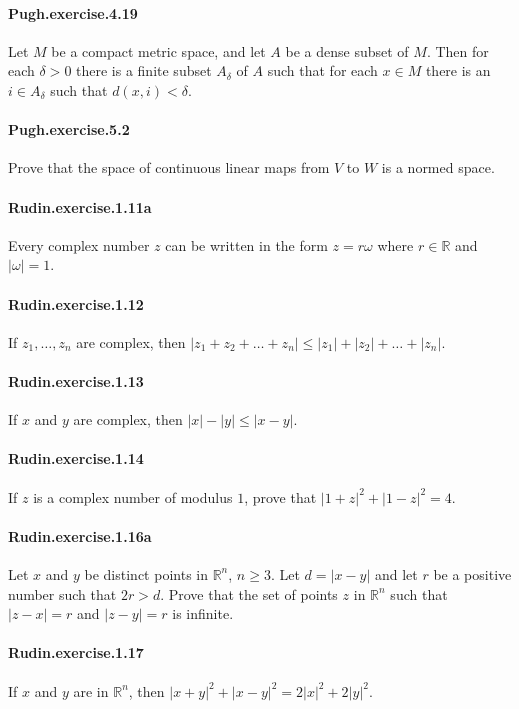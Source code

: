 \documentclass{article}
\begin{document}
\paragraph{Pugh.exercise.4.19} Let $M$ be a compact metric space, and let $A$ be a dense subset of $M$. Then for each $\delta > 0$ there is a finite subset $A_\delta$ of $A$ such that for each $x\in M$ there is an $i\in A_\delta$ such that $d(x, i) < \delta$.

\paragraph{Pugh.exercise.5.2} Prove that the space of continuous linear maps from $V$ to $W$ is a normed space.

\paragraph{Rudin.exercise.1.11a} Every complex number $z$ can be written in the form $z=r\omega$ where $r\in\mathbb{R}$ and $|\omega|=1$.

\paragraph{Rudin.exercise.1.12} If $z_1, \dots, z_n$ are complex, then $|z_1 + z_2 + \dots + z_n|\leq |z_1| + |z_2| + \dots + |z_n|$.

\paragraph{Rudin.exercise.1.13} If $x$ and $y$ are complex, then $|x|-|y|\leq |x-y|$.

\paragraph{Rudin.exercise.1.14} If $z$ is a complex number of modulus $1$, prove that $|1+z|^2 + |1-z|^2 = 4$.

\paragraph{Rudin.exercise.1.16a} Let $x$ and $y$ be distinct points in $\mathbb{R}^n$, $n\geq 3$. Let $d=|x-y|$ and let $r$ be a positive number such that $2r>d$. Prove that the set of points $z$ in $\mathbb{R}^n$ such that $|z-x|=r$ and $|z-y|=r$ is infinite.

\paragraph{Rudin.exercise.1.17} If $x$ and $y$ are in $\mathbb{R}^n$, then $|x+y|^2 + |x-y|^2 = 2|x|^2 + 2|y|^2$.
\end{document}
